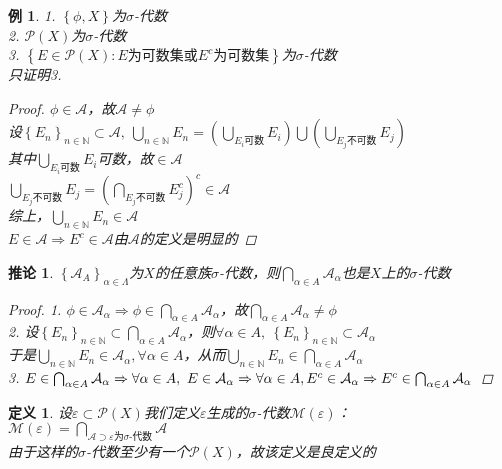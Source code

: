 \documentclass[12pt, a4paper, oneside]{ctexbook}
\newtheorem{definition}[theorem]{定义}
\newtheorem{corollary}[theorem]{推论}
\newtheorem{example}[theorem]{例}
\begin{document}
\begin{example}
    1. $\left\{\phi,X\right\}$为$\sigma$-代数\\
    2. $\mathcal{P}(X)$为$\sigma$-代数\\
    3. $\left\{E\in\mathcal{P}(X):E\text{为可数集或}E^c\text{为可数集}\right\}$为$\sigma$-代数\\
    只证明3.
    \begin{proof}
        $\phi\in\mathcal{A}$，故$\mathcal{A}\neq\phi$\\
        设$\left\{E_n\right\}_{n\in\mathbb{N}}\subset\mathcal{A},\ \bigcup_{n\in\mathbb{N}}E_n=(\bigcup_{E_i\text{可数}}E_i)\bigcup(\bigcup_{E_j\text{不可数}}E_j)$\\
        其中$\bigcup_{E_i\text{可数}}E_i$可数，故$\in\mathcal{A}$\\
        $\bigcup_{E_j\text{不可数}}E_j=(\bigcap_{E_j\text{不可数}}E_j^c)^c\in\mathcal{A}$\\
        综上，$\bigcup_{n\in\mathbb{N}}E_n\in\mathcal{A}$\\
        $E\in\mathcal{A}\Rightarrow E^c\in\mathcal{A}$由$\mathcal{A}$的定义是明显的
    \end{proof}
\end{example}
\begin{corollary}
    $\left\{\mathcal{A}_A\right\}_{\alpha\in\Lambda}$为$X$的任意族$\sigma$-代数，则$\bigcap_{\alpha\in A}\mathcal{A}_{\alpha}$也是$X$上的$\sigma$-代数
    \begin{proof}
        1. $\phi\in\mathcal{A}_{\alpha}\Rightarrow\phi\in\bigcap_{\alpha\in A}\mathcal{A}_{\alpha}$，故$\bigcap_{\alpha\in A}\mathcal{A}_{\alpha}\neq\phi$\\
        2. 设$\left\{E_n\right\}_{n\in\mathbb{N}}\subset\bigcap_{\alpha\in A}\mathcal{A}_{\alpha}$，则$\forall \alpha\in A,\ \left\{E_n\right\}_{n\in \mathbb{N}}\subset\mathcal{A}_{\alpha}$\\
        于是$\bigcup_{n\in\mathbb{N}}E_n\in\mathcal{A}_{\alpha},\forall\alpha\in A$，从而$\bigcup_{n\in\mathbb{N}}E_n\in\bigcap_{\alpha\in A}\mathcal{A}_{\alpha}$\\
        3. $E\in\bigcap_{\alpha\in A}\mathcal{A}_{\alpha}\Rightarrow\forall\alpha\in A,\ E\in\mathcal{A}_{\alpha}\Rightarrow\forall\alpha\in A,E^c\in\mathcal{A}_{\alpha}\\
        \Rightarrow E^c\in\bigcap_{\alpha\in A}\mathcal{A}_{\alpha}$
    \end{proof}
\end{corollary}
\begin{definition}
    设$\varepsilon\subset\mathcal{P}(X)$我们定义$\varepsilon$生成的$\sigma$-代数$\mathcal{M}(\varepsilon)$：\\
    $\mathcal{M}(\varepsilon)=\bigcap_{\mathcal{A}\supset\varepsilon\text{为$\sigma$-代数}}\mathcal{A}$\\
    由于这样的$\sigma$-代数至少有一个$\mathcal{P}(X)$，故该定义是良定义的
\end{definition}
\end{document}
